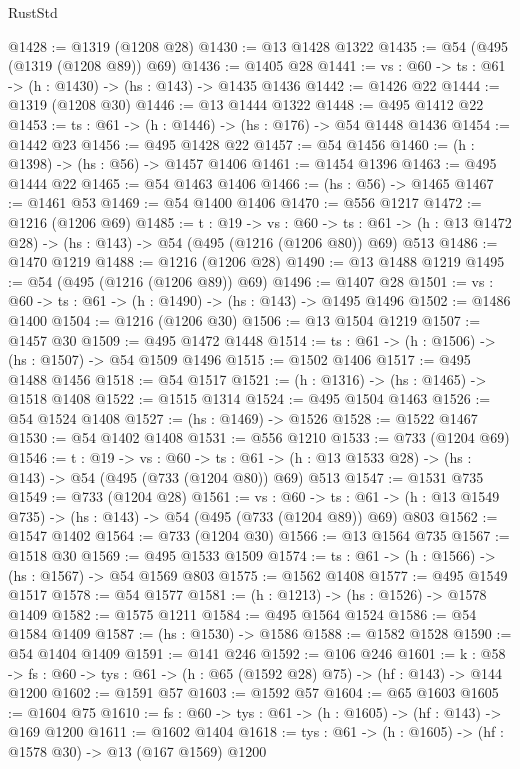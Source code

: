\begin{lexlean}{RustStd}
\begin{coremodule}
@1428 := @1319 (@1208 @28)
@1430 := @13 @1428 @1322
@1435 := @54 (@495 (@1319 (@1208 @89)) @69)
@1436 := @1405 @28
@1441 := {vs : @60} -> {ts : @61} -> (h : @1430) -> (hs : @143) -> @1435 @1436
@1442 := @1426 @22
@1444 := @1319 (@1208 @30)
@1446 := @13 @1444 @1322
@1448 := @495 @1412 @22
@1453 := {ts : @61} -> (h : @1446) -> (hs : @176) -> @54 @1448 @1436
@1454 := @1442 @23
@1456 := @495 @1428 @22
@1457 := @54 @1456
@1460 := (h : @1398) -> (hs : @56) -> @1457 @1406
@1461 := @1454 @1396
@1463 := @495 @1444 @22
@1465 := @54 @1463 @1406
@1466 := (hs : @56) -> @1465
@1467 := @1461 @53
@1469 := @54 @1400 @1406
@1470 := @556 @1217
@1472 := @1216 (@1206 @69)
@1485 := {t : @19} ->
  {vs : @60} ->
  {ts : @61} -> (h : @13 @1472 @28) -> (hs : @143) -> @54 (@495 (@1216 (@1206 @80)) @69) @513
@1486 := @1470 @1219
@1488 := @1216 (@1206 @28)
@1490 := @13 @1488 @1219
@1495 := @54 (@495 (@1216 (@1206 @89)) @69)
@1496 := @1407 @28
@1501 := {vs : @60} -> {ts : @61} -> (h : @1490) -> (hs : @143) -> @1495 @1496
@1502 := @1486 @1400
@1504 := @1216 (@1206 @30)
@1506 := @13 @1504 @1219
@1507 := @1457 @30
@1509 := @495 @1472 @1448
@1514 := {ts : @61} -> (h : @1506) -> (hs : @1507) -> @54 @1509 @1496
@1515 := @1502 @1406
@1517 := @495 @1488 @1456
@1518 := @54 @1517
@1521 := (h : @1316) -> (hs : @1465) -> @1518 @1408
@1522 := @1515 @1314
@1524 := @495 @1504 @1463
@1526 := @54 @1524 @1408
@1527 := (hs : @1469) -> @1526
@1528 := @1522 @1467
@1530 := @54 @1402 @1408
@1531 := @556 @1210
@1533 := @733 (@1204 @69)
@1546 := {t : @19} ->
  {vs : @60} ->
  {ts : @61} -> (h : @13 @1533 @28) -> (hs : @143) -> @54 (@495 (@733 (@1204 @80)) @69) @513
@1547 := @1531 @735
@1549 := @733 (@1204 @28)
@1561 := {vs : @60} ->
  {ts : @61} -> (h : @13 @1549 @735) -> (hs : @143) -> @54 (@495 (@733 (@1204 @89)) @69) @803
@1562 := @1547 @1402
@1564 := @733 (@1204 @30)
@1566 := @13 @1564 @735
@1567 := @1518 @30
@1569 := @495 @1533 @1509
@1574 := {ts : @61} -> (h : @1566) -> (hs : @1567) -> @54 @1569 @803
@1575 := @1562 @1408
@1577 := @495 @1549 @1517
@1578 := @54 @1577
@1581 := (h : @1213) -> (hs : @1526) -> @1578 @1409
@1582 := @1575 @1211
@1584 := @495 @1564 @1524
@1586 := @54 @1584 @1409
@1587 := (hs : @1530) -> @1586
@1588 := @1582 @1528
@1590 := @54 @1404 @1409
@1591 := @141 @246
@1592 := @106 @246
@1601 := {k : @58} ->
  {fs : @60} -> {tys : @61} -> (h : @65 (@1592 @28) @75) -> (hf : @143) -> @144 @1200
@1602 := @1591 @57
@1603 := @1592 @57
@1604 := @65 @1603
@1605 := @1604 @75
@1610 := {fs : @60} -> {tys : @61} -> (h : @1605) -> (hf : @143) -> @169 @1200
@1611 := @1602 @1404
@1618 := {tys : @61} -> (h : @1605) -> (hf : @1578 @30) -> @13 (@167 @1569) @1200

\end{coremodule}
\end{lexlean}
